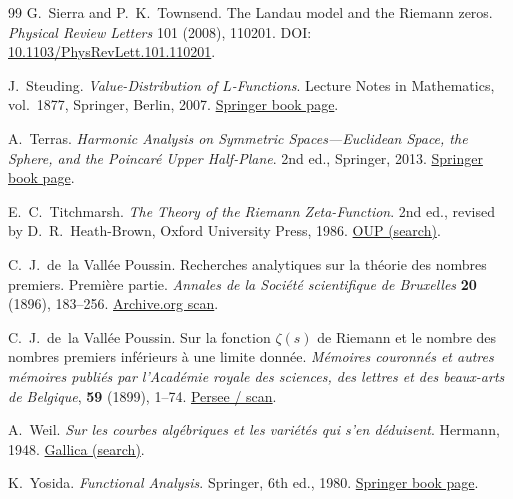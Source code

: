 \documentclass{article}
\numberwithin{equation}{section}
\theoremstyle{plain}
\theoremstyle{definition}
\theoremstyle{remark}
\begin{document}
\begin{thebibliography}{99}
G.~Sierra and P.~K.~Townsend.
\newblock The Landau model and the Riemann zeros.
\newblock \emph{Physical Review Letters} 101 (2008), 110201.
\newblock DOI: \href{https://doi.org/10.1103/PhysRevLett.101.110201}{10.1103/PhysRevLett.101.110201}.


J.~Steuding.
\newblock \emph{Value-Distribution of $L$-Functions}.
\newblock Lecture Notes in Mathematics, vol.~1877, Springer, Berlin, 2007.
\newblock \href{https://link.springer.com/book/10.1007/978-3-540-44822-8}{Springer book page}.


A.~Terras.
\newblock \emph{Harmonic Analysis on Symmetric Spaces---Euclidean Space, the Sphere, and the Poincar\'e Upper Half-Plane}.
\newblock 2nd ed., Springer, 2013.
\newblock \href{https://link.springer.com/book/10.1007/978-1-4614-7972-7}{Springer book page}.


E.~C.~Titchmarsh.
\newblock \emph{The Theory of the Riemann Zeta-Function}.
\newblock 2nd ed., revised by D.~R.~Heath-Brown, Oxford University Press, 1986.
\newblock \href{https://global.oup.com/}{OUP (search)}.

C.~J.~de~la Vall\'ee Poussin.
\newblock Recherches analytiques sur la th\'eorie des nombres premiers. Premi\`ere partie.
\newblock \emph{Annales de la Soci\'et\'e scientifique de Bruxelles} \textbf{20} (1896), 183--256.
\newblock \href{https://archive.org/details/recherchesanaly00pousgoog}{Archive.org scan}.


C.~J.~de~la Vall\'ee Poussin.
\newblock Sur la fonction $\zeta(s)$ de Riemann et le nombre des nombres premiers inf\'erieurs \`a une limite donn\'ee.
\newblock \emph{M\'emoires couronn\'es et autres m\'emoires publi\'es par l'Acad\'emie royale des sciences, des lettres et des beaux-arts de Belgique}, \textbf{59} (1899), 1--74.
\newblock \href{https://www.persee.fr/doc/marb_0770-8459_1899_num_59_1_2449}{Persee / scan}.


A.~Weil.
\newblock \emph{Sur les courbes alg\'ebriques et les vari\'et\'es qui s'en d\'eduisent}.
\newblock Hermann, 1948.
\newblock \href{https://gallica.bnf.fr/}{Gallica (search)}.

K.~Yosida.
\newblock \emph{Functional Analysis}.
\newblock Springer, 6th ed., 1980.
\newblock \href{https://link.springer.com/book/10.1007/978-3-642-61859-1}{Springer book page}.


\end{thebibliography}
\end{document}
